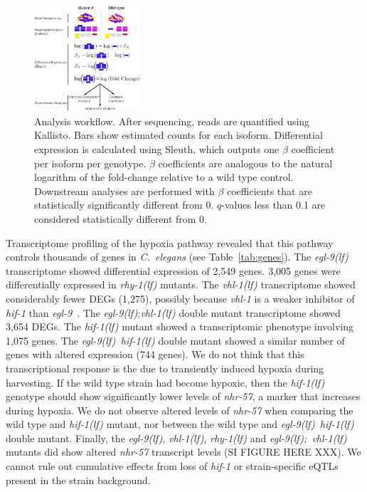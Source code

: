 \documentclass[9pt,twocolumn,twoside]{pnas-new}
\newcommand{\cel}{\emph{C.~elegans}}
\newcommand{\gene}[1]{\mbox{\emph{#1}}}
\newcommand{\egl}{\gene{egl-9(lf)}}
\newcommand{\rhy}{\gene{rhy-1(lf)}}
\newcommand{\vhl}{\gene{vhl-1(lf)}}
\newcommand{\eglvhl}{\gene{egl-9(lf); vhl-1(lf)}}
\newcommand{\eglhif}{\gene{egl-9(lf) hif-1(lf)}}
\newcommand{\hif}{\gene{hif-1(lf)}}
\newcommand{\egln}{2,549}
\newcommand{\rhyn}{3,005}
\newcommand{\vhln}{1,275}
\newcommand{\eglvhln}{3,654}
\newcommand{\hifn}{1,075}
\newcommand{\eglhifn}{744}
\begin{document}
\begin{figure}[tbhp]
  \centering
  \includegraphics[width=0.35\textwidth]{../figs/meaningofbeta.pdf}
  \caption{
    Analysis workflow. After sequencing, reads are quantified using Kallisto.
    Bars show estimated counts for each isoform. Differential expression is
    calculated using Sleuth, which outputs one $\beta$ coefficient per isoform
    per genotype. $\beta$ coefficients are analogous to the natural logarithm of
    the fold-change relative to a wild type control. Downstream analyses are
    performed with $\beta$ coefficients that are statistically significantly
    different from 0. $q$-values less than 0.1 are considered statistically
    different from 0.
  }
\label{fig:explain}
\end{figure}

Transcriptome profiling of the hypoxia pathway revealed that this pathway
controls thousands of genes in \cel{} (see Table~\ref{tab:genes}). The \egl{}
transcriptome showed differential expression of \egln{} genes. \rhyn{} genes
were differentially expressed in \rhy{} mutants. The \vhl{} transcriptome showed
considerably fewer DEGs (\vhln{}), possibly because \gene{vhl-1} is a weaker
inhibitor of \gene{hif-1} than \gene{egl-9}~\cite{Shao2009}. The \egl{};\vhl{}
double mutant transcriptome showed \eglvhln{} DEGs. The \hif{} mutant showed a
transcriptomic phenotype involving \hifn{} genes. The \eglhif{} double mutant
showed a similar number of genes with altered expression (\eglhifn{} genes).
\color{purple}
We do not think that this transcriptional response is the due to transiently
induced hypoxia during harvesting. If the wild type strain had become hypoxic,
then the \hif{} genotype should show significantly lower
levels of \gene{nhr-57}, a marker that increases during hypoxia.
We do not observe altered levels of \gene{nhr-57} when comparing
the wild type and \hif{} mutant, nor between the wild type and \eglhif{} double
mutant. Finally, the \egl{}, \vhl{}, \rhy{} and \eglvhl{} mutants did show
altered \gene{nhr-57} transcript levels (SI FIGURE HERE XXX). We cannot rule out
cumulative effects from loss of \gene{hif-1} or strain-specific eQTLs
present in the strain background.
\color{black}
\end{document}
